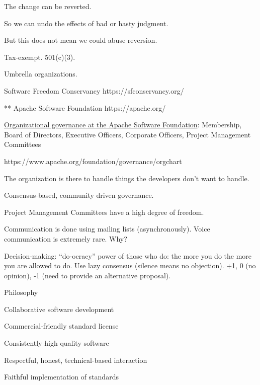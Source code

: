 \documentclass[landscape,30pt]{foils}
\begin{document}
The change can be reverted.

So we can undo the effects of bad or hasty judgment.

But this does not mean we could abuse reversion.



Tax-exempt.  501(c)(3).

Umbrella organizations.

Software Freedom Conservancy https://sfconservancy.org/

** Apache Software Foundation https://apache.org/

\underline{Organizational governance at the Apache Software Foundation}: Membership, Board of Directors, Executive Officers, Corporate Officers, Project Management Committees

https://www.apache.org/foundation/governance/orgchart




The organization is there to handle things the developers don't want to handle.


Consensus-based, community driven governance.

Project Management Committees have a high degree of freedom.

Communication is done using mailing lists (asynchronously).  Voice communication is extremely rare.  Why?

Decision-making: ``do-ocracy'' power of those who do: the more you do the more you are allowed to do.  Use lazy consensus (silence means no objection). +1, 0 (no opinion), -1 (need to provide an alternative proposal).

Philosophy

Collaborative software development

Commercial-friendly standard license

Consistently high quality software

Respectful, honest, technical-based interaction

Faithful implementation of standards
\end{document}
